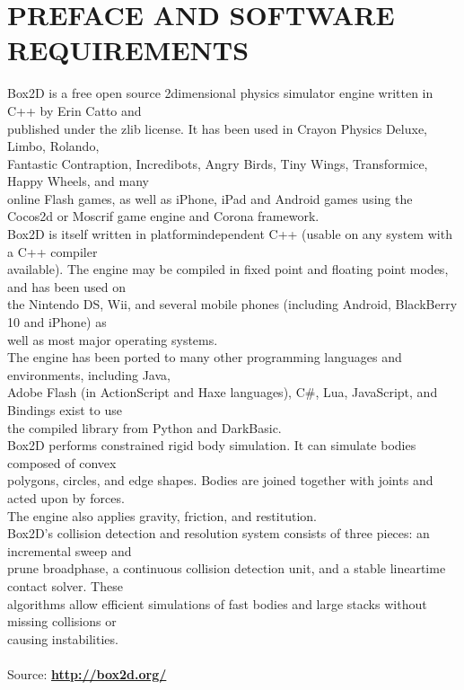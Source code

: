 \documentclass[a4paper, 11pt]{article}
\begin{document}
\section{\large{PREFACE AND SOFTWARE REQUIREMENTS}}
\large{
Box2D is a free open source 2­dimensional physics simulator engine written in C++ by Erin Catto and \\
published under the zlib license. It has been used in Crayon Physics Deluxe, Limbo, Rolando, \\
Fantastic Contraption, Incredibots, Angry Birds, Tiny Wings, Transformice, Happy Wheels, and many\\
online Flash games, as well as iPhone, iPad and Android games using the Cocos2d or Moscrif game
engine and Corona framework. \\
Box2D is itself written in platform­independent C++ (usable on any system with a C++ compiler \\
available). The engine may be compiled in fixed point and floating point modes, and has been used on \\
the Nintendo DS, Wii, and several mobile phones (including Android, BlackBerry 10 and iPhone) as \\
well as most major operating systems. \\
The engine has been ported to many other programming languages and environments, including Java, \\
Adobe Flash (in ActionScript and Haxe languages), C\#, Lua, JavaScript, and Bindings exist to use \\
the compiled library from Python   and DarkBasic.\\
Box2D performs constrained rigid body simulation. It can simulate bodies composed of convex \\
polygons, circles, and edge shapes. Bodies are joined together with joints and acted upon by forces. \\
The engine also applies gravity, friction, and restitution. \\
Box2D's collision detection and resolution system consists of three pieces: an incremental sweep and \\
prune broadphase, a continuous collision detection unit, and a stable linear­time contact solver. These \\
algorithms allow efficient simulations of fast bodies and large stacks without missing collisions or \\
causing instabilities.\\\\
Source:  \href{''http://box2d.org/''}{\textbf{http://box2d.org/}}
}
\clearpage
\end{document}
